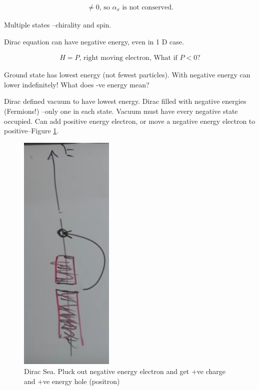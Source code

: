 \documentclass[]{article}
\begin{document}
\begin{align*}
[H,\alpha_x] \ne 0 \text{, so $\alpha_x$ is not conserved.}
\end{align*}


Multiple states --chirality and spin.

Dirac equation can have negative energy, even in 1 D case.

\begin{align*}
H=P \text{, right moving electron, What if $P<0$?}
\end{align*} 

Ground state has lowest energy (not fewest particles). With negative energy can lower indefinitely! What does -ve energy mean?

Dirac defined vacuum to have lowest energy. Dirac filled with negative energies (Fermions!) --only one in each state. Vacuum must have every negative state occupied. Can add positive energy electron, or move a negative energy electron to positive--Figure \ref{fig:dirac:sea}.

\begin{figure}[H]
	\begin{center}
		\caption[Dirac Sea]{Dirac Sea. Pluck out negative energy electron and get +ve charge and +ve energy hole (positron)}\label{fig:dirac:sea}
		\includegraphics[width=0.4\textwidth]{DiracSea}
	\end{center}
\end{figure}
\end{document}

